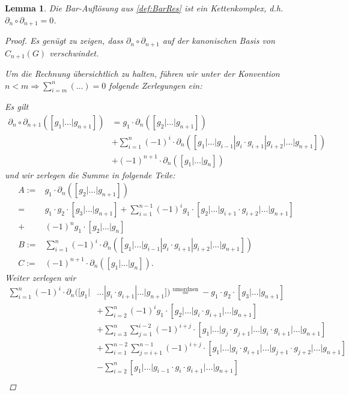 \documentclass[a4paper,twoside,10pt]{scrreprt}
\newtheorem{lemma}[satz]{Lemma}
\theoremstyle{definition}
\begin{document}
\begin{lemma}\label{lem:ProofBarIsChainComplex}
Die Bar-Auflösung aus \cref{def:BarRes} ist ein Kettenkomplex, d.h. $\partial_n\circ \partial_{n+1}=0$.
\begin{proof}
Es genügt zu zeigen, dass $\partial_n\circ \partial_{n+1}$ auf der kanonischen Basis von $C_{n+1}(G)$ verschwindet.\par
Um die Rechnung übersichtlich zu halten, führen wir unter der Konvention $n<m\Longrightarrow\sum\limits_{i=m}^n (\ldots)=0$ folgende Zerlegungen ein:
\par Es gilt
\begin{align*}
\partial_n\circ \partial_{n+1}([g_1|\ldots|g_{n+1}])&=g_1\cdot\partial_n([g_2|\ldots|g_{n+1}])\\ 
&+\sum\limits_{i=1}^n (-1)^i\cdot\partial_n([g_1|\ldots|g_{i-1}|g_i\cdot g_{i+1}|g_{i+2}|\ldots|g_{n+1}])\\
&+(-1)^{n+1}\cdot\partial_n([g_1|\ldots|g_n])
\end{align*}
und wir zerlegen die Summe in folgende Teile:
\begin{align*}
A:=&g_1\cdot\partial_n([g_2|\ldots|g_{n+1}])\\
=&g_1\cdot g_2\cdot [g_3|\ldots|g_{n+1}]+\sum\limits_{i=1}^{n-1}(-1)^i g_1\cdot[g_2|\ldots|g_{i+1}\cdot g_{i+2}|\ldots|g_{n+1}]\\
+&(-1)^n g_1\cdot[g_2|\ldots|g_{n}]\\
B:=&\sum\limits_{i=1}^n (-1)^i\cdot\partial_n([g_1|\ldots|g_{i-1}|g_i\cdot g_{i+1}|g_{i+2}|\ldots|g_{n+1}])\\
C:=&(-1)^{n+1}\cdot\partial_n([g_1|\ldots|g_n]).
\end{align*}
Weiter zerlegen wir 
\begin{align*}
\sum\limits_{i=1}^n (-1)^i\cdot\partial_n([g_1|&\ldots|g_i\cdot g_{i+1}|\ldots|g_{n+1}])\overset{\text{umordnen}}{=}-g_1\cdot g_2\cdot [g_3|\ldots|g_{n+1}]\\
&+\sum\limits_{i=2}^{n}(-1)^i g_1\cdot [g_2|\ldots|g_i\cdot g_{i+1}|\ldots|g_{n+1}]\\
&+\sum\limits_{i=3}^n\sum\limits_{j=1}^{i-2}(-1)^{i+j}\cdot [g_1|\ldots |g_j\cdot g_{j+1}|\ldots |g_i\cdot g_{i+1}|\ldots |g_{n+1}]\\
&+\sum\limits_{i=1}^{n-2}\sum\limits_{j=i+1}^{n-1}(-1)^{i+j}\cdot [g_1|\ldots|g_i\cdot g_{i+1}|\ldots|g_{j+1}\cdot g_{j+2}|\ldots|g_{n+1}]\\
&-\sum\limits_{i=2}^n [g_1|\ldots|g_{i-1}\cdot g_{i}\cdot g_{i+1}|\ldots|g_{n+1}]\\

\end{align*}
\end{proof}
\end{lemma}
\end{document}
